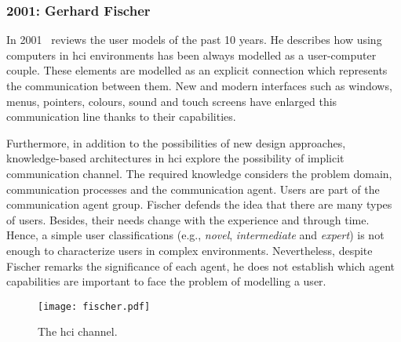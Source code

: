 \subsubsection{2001: Gerhard Fischer}
\label{sec:fischer_user_2001}

In 2001~\citet{fischer_user_2001} reviews the user models of the past 10 years. 
He describes how using computers in \ac{hci} environments has been always
modelled as a user-computer couple. These elements are modelled as an explicit 
connection which represents the communication between them. New and modern 
interfaces such as windows, menus, pointers, colours, sound and touch screens 
have enlarged this communication line thanks to their capabilities.

Furthermore, in addition to the possibilities of new design approaches,
knowledge-based architectures in \ac{hci} explore the possibility of implicit
communication channel. The required knowledge considers the problem domain,
communication processes and the communication agent. Users are part of the
communication agent group. Fischer defends the idea that there are many types of
users. Besides, their needs change with the experience and through time.
Hence, a simple user classifications (e.g., \textit{novel}, \textit{intermediate}
and \textit{expert}) is not enough to characterize users in complex environments. 
Nevertheless, despite Fischer remarks the significance of each agent, he does 
not establish which agent capabilities are important to face the problem of 
modelling a user.


\begin{figure}
\centering
\texttt{[image: fischer.pdf]}
\caption{The \ac{hci} channel.}
\label{fig:fischer}
\end{figure}